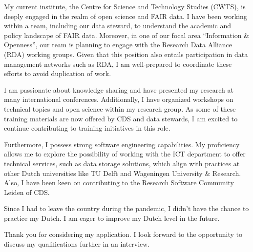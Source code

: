 \documentclass[11pt, a4paper]{awesome-cv}
\begin{document}
\begin{cvletter}
My current institute, the Centre for Science and Technology Studies (CWTS), is deeply engaged in the realm of open science and FAIR data. I have been working within a team, including our data steward, to understand the academic and policy landscape of FAIR data. Moreover, in one of our focal area “Information \& Openness”, our team is planning to engage with the Research Data Alliance (RDA) working groups. Given that this position also entails participation in data management networks such as RDA, I am well-prepared to coordinate these efforts to avoid duplication of work.

I am passionate about knowledge sharing and have presented my research at many international conferences. Additionally, I have organized workshops on technical topics and open science within my research group. As some of these training materials are now offered by CDS and data stewards, I am excited to continue contributing to training initiatives in this role.

Furthermore, I possess strong software engineering capabilities. My proficiency allows me to explore the possibility of working with the ICT department to offer technical services, such as data storage solutions, which align with practices at other Dutch universities like TU Delft and Wageningen University \& Research. Also, I have been keen on contributing to the Research Software Community Leiden of CDS.

Since I had to leave the country during the pandemic, I didn’t have the chance to practice my Dutch. I am eager to improve my Dutch level in the future.

Thank you for considering my application. I look forward to the opportunity to discuss my qualifications further in an interview.


\end{cvletter}


\makeletterclosing
\end{document}
